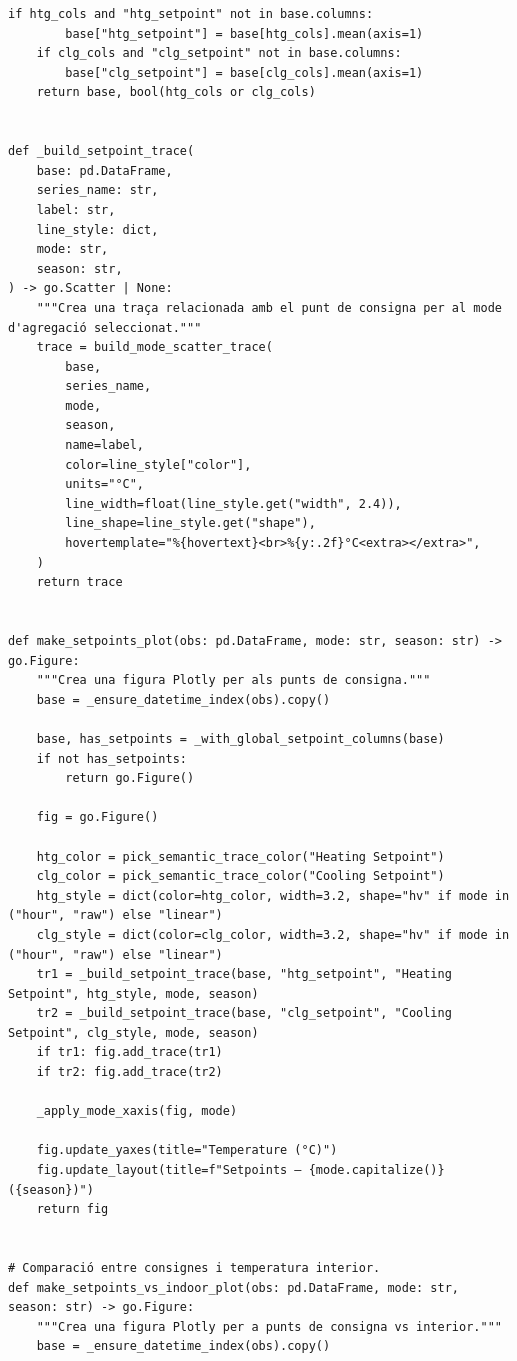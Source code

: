 \documentclass[10pt,a4paper]{article}
\begin{document}
\begin{lstlisting}[style=studioPython,caption={backend/grafics/thermal.py},label={lst:backend-grafics-thermal-py}]
    if htg_cols and "htg_setpoint" not in base.columns:
        base["htg_setpoint"] = base[htg_cols].mean(axis=1)
    if clg_cols and "clg_setpoint" not in base.columns:
        base["clg_setpoint"] = base[clg_cols].mean(axis=1)
    return base, bool(htg_cols or clg_cols)


def _build_setpoint_trace(
    base: pd.DataFrame,
    series_name: str,
    label: str,
    line_style: dict,
    mode: str,
    season: str,
) -> go.Scatter | None:
    """Crea una traça relacionada amb el punt de consigna per al mode d'agregació seleccionat."""
    trace = build_mode_scatter_trace(
        base,
        series_name,
        mode,
        season,
        name=label,
        color=line_style["color"],
        units="°C",
        line_width=float(line_style.get("width", 2.4)),
        line_shape=line_style.get("shape"),
        hovertemplate="%{hovertext}<br>%{y:.2f}°C<extra></extra>",
    )
    return trace


def make_setpoints_plot(obs: pd.DataFrame, mode: str, season: str) -> go.Figure:
    """Crea una figura Plotly per als punts de consigna."""
    base = _ensure_datetime_index(obs).copy()

    base, has_setpoints = _with_global_setpoint_columns(base)
    if not has_setpoints:
        return go.Figure()

    fig = go.Figure()

    htg_color = pick_semantic_trace_color("Heating Setpoint")
    clg_color = pick_semantic_trace_color("Cooling Setpoint")
    htg_style = dict(color=htg_color, width=3.2, shape="hv" if mode in ("hour", "raw") else "linear")
    clg_style = dict(color=clg_color, width=3.2, shape="hv" if mode in ("hour", "raw") else "linear")
    tr1 = _build_setpoint_trace(base, "htg_setpoint", "Heating Setpoint", htg_style, mode, season)
    tr2 = _build_setpoint_trace(base, "clg_setpoint", "Cooling Setpoint", clg_style, mode, season)
    if tr1: fig.add_trace(tr1)
    if tr2: fig.add_trace(tr2)

    _apply_mode_xaxis(fig, mode)

    fig.update_yaxes(title="Temperature (°C)")
    fig.update_layout(title=f"Setpoints – {mode.capitalize()} ({season})")
    return fig


# Comparació entre consignes i temperatura interior.
def make_setpoints_vs_indoor_plot(obs: pd.DataFrame, mode: str, season: str) -> go.Figure:
    """Crea una figura Plotly per a punts de consigna vs interior."""
    base = _ensure_datetime_index(obs).copy()


\end{lstlisting}
\end{document}
